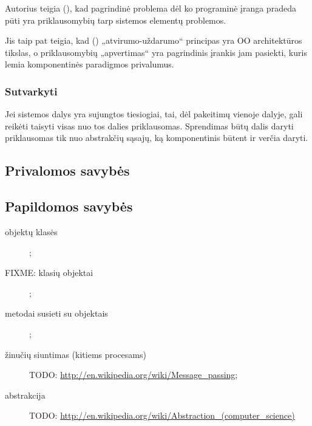 Autorius teigia (\cite[4]{design-principles-and-design-patterns}), kad
pagrindinė problema dėl ko programinė įranga pradeda pūti yra
priklausomybių tarp sistemos elementų problemos.

Jis taip pat teigia, kad
(\cite[12]{design-principles-and-design-patterns}) „atvirumo-uždarumo“
principas yra OO architektūros tikslas, o priklausomybių
„apvertimas“  yra pagrindinis įrankis jam
pasiekti, kuris lemia komponentinės paradigmos privalumus.

\subsubsection{Sutvarkyti}

Jei sistemos dalys yra sujungtos tiesiogiai, tai, dėl pakeitimų vienoje
dalyje, gali reikėti taisyti visas nuo tos dalies priklausomas. Sprendimas
būtų dalis daryti priklausomas tik nuo abstrakčių sąsajų, ką komponentinis
būtent ir verčia daryti.

\subsection{Privalomos savybės}
\subsection{Papildomos savybės}

\begin{description}
  \item[objektų klasės] ;
  \item[FIXME: klasių objektai] ;
  \item[metodai susieti su objektais] ;
  \item[žinučių siuntimas (kitiems procesams)] 
    TODO: \url{http://en.wikipedia.org/wiki/Message_passing};
  \item[abstrakcija] 
    TODO: \url{http://en.wikipedia.org/wiki/Abstraction_(computer_science)}
\end{description}
